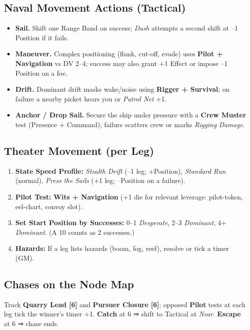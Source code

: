 \documentclass[11pt,oneside]{book}
\begin{document}
\subsection*{Naval Movement Actions (Tactical)}
\begin{itemize}
  \item \textbf{Sail.} Shift one Range Band on success; \emph{Dash} attempts a second shift at --1 Position if it fails.
  \item \textbf{Maneuver.} Complex positioning (flank, cut-off, evade) uses \textbf{Pilot + Navigation} vs DV 2--4; success may also grant +1 Effect or impose --1 Position on a foe.
  \item \textbf{Drift.} Dominant drift masks wake/noise using \textbf{Rigger + Survival}; on failure a nearby picket hears you or \textit{Patrol Net} +1.
  \item \textbf{Anchor / Drop Sail.} Secure the ship under pressure with a \textbf{Crew Muster} test (Presence + Command); failure scatters crew or marks \textit{Rigging Damage}.
\end{itemize}

\subsection*{Theater Movement (per Leg)}
\begin{enumerate}[leftmargin=*,itemsep=2pt]
  \item \textbf{State Speed Profile:} \emph{Stealth Drift} (--1 leg; +Position), \emph{Standard Run} (normal), \emph{Press the Sails} (+1 leg; --Position on a failure).
  \item \textbf{Pilot Test:} \textbf{Wits + Navigation} (+1 die for relevant leverage: pilot-token, eel-chart, convoy slot).
  \item \textbf{Set Start Position by Successes:} 0--1 \emph{Desperate}, 2--3 \emph{Dominant}, 4+ \emph{Dominant}. (A 10 counts as 2 successes.)
  \item \textbf{Hazards:} If a leg lists hazards (boom, fog, reef), resolve or tick a timer (GM).
\end{enumerate}

\subsection*{Chases on the Node Map}
Track \textbf{Quarry Lead [6]} and \textbf{Pursuer Closure [6]}; opposed \textbf{Pilot} tests at each leg tick the winner's timer +1. \textbf{Catch} at 6 ⇒ shift to Tactical at \emph{Near}. \textbf{Escape} at 6 ⇒ chase ends.
\end{document}
